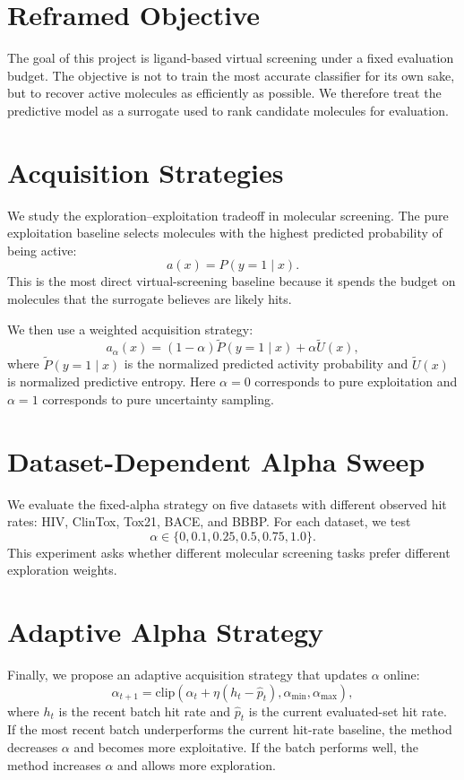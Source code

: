 \section{Reframed Objective}
The goal of this project is ligand-based virtual screening under a fixed evaluation budget. The objective is not to train the most accurate classifier for its own sake, but to recover active molecules as efficiently as possible. We therefore treat the predictive model as a surrogate used to rank candidate molecules for evaluation.

\section{Acquisition Strategies}
We study the exploration--exploitation tradeoff in molecular screening. The pure exploitation baseline selects molecules with the highest predicted probability of being active:
\[
a(x)=P(y=1 \mid x).
\]
This is the most direct virtual-screening baseline because it spends the budget on molecules that the surrogate believes are likely hits.

We then use a weighted acquisition strategy:
\[
a_{\alpha}(x)=(1-\alpha)\widetilde{P}(y=1 \mid x)+\alpha \widetilde{U}(x),
\]
where $\widetilde{P}(y=1 \mid x)$ is the normalized predicted activity probability and $\widetilde{U}(x)$ is normalized predictive entropy. Here $\alpha=0$ corresponds to pure exploitation and $\alpha=1$ corresponds to pure uncertainty sampling.

\section{Dataset-Dependent Alpha Sweep}
We evaluate the fixed-alpha strategy on five datasets with different observed hit rates: HIV, ClinTox, Tox21, BACE, and BBBP. For each dataset, we test
\[
\alpha \in \{0, 0.1, 0.25, 0.5, 0.75, 1.0\}.
\]
This experiment asks whether different molecular screening tasks prefer different exploration weights.

\section{Adaptive Alpha Strategy}
Finally, we propose an adaptive acquisition strategy that updates $\alpha$ online:
\[
\alpha_{t+1}=\mathrm{clip}\left(\alpha_t+\eta(h_t-\hat{p}_t),\alpha_{\min},\alpha_{\max}\right),
\]
where $h_t$ is the recent batch hit rate and $\hat{p}_t$ is the current evaluated-set hit rate. If the most recent batch underperforms the current hit-rate baseline, the method decreases $\alpha$ and becomes more exploitative. If the batch performs well, the method increases $\alpha$ and allows more exploration.

